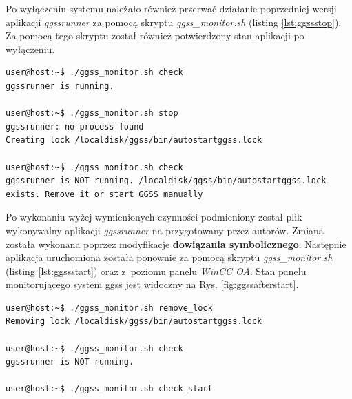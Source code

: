 \newpage
Po wyłączeniu systemu należało również przerwać działanie poprzedniej wersji aplikacji \textit{ggssrunner} za pomocą skryptu \textit{ggss\_monitor.sh} (listing \ref{lst:ggssstop}). Za pomocą tego skryptu został również potwierdzony stan aplikacji po wyłączeniu.


\begin{lstlisting}[language=Cmd, caption={Zatrzymanie działania aplikacji \textit{ggssrunner}}, label={lst:ggssstop}]
user@host:~$ ./ggss_monitor.sh check
ggssrunner is running.

user@host:~$ ./ggss_monitor.sh stop
ggssrunner: no process found
Creating lock /localdisk/ggss/bin/autostartggss.lock

user@host:~$ ./ggss_monitor.sh check
ggssrunner is NOT running. /localdisk/ggss/bin/autostartggss.lock exists. Remove it or start GGSS manually
\end{lstlisting}



Po wykonaniu wyżej wymienionych czynności podmieniony został plik wykonywalny aplikacji \textit{ggssrunner} na przygotowany przez autorów. Zmiana została wykonana poprzez modyfikacje \textbf{dowiązania symbolicznego}. Następnie aplikacja uruchomiona została ponownie za pomocą skryptu \textit{ggss\_monitor.sh} (listing \ref{lst:ggssstart}) oraz z~poziomu panelu \textit{WinCC OA}. Stan panelu monitorującego system \gls*{ggss} jest widoczny na Rys. \ref{fig:ggssafterstart}.

\begin{lstlisting}[language=Cmd, caption={Ponowne uruchomienie aplikacji \textit{ggssrunner}}, label={lst:ggssstart}]
user@host:~$ ./ggss_monitor.sh remove_lock
Removing lock /localdisk/ggss/bin/autostartggss.lock

user@host:~$ ./ggss_monitor.sh check
ggssrunner is NOT running.

user@host:~$ ./ggss_monitor.sh check_start
\end{lstlisting}


